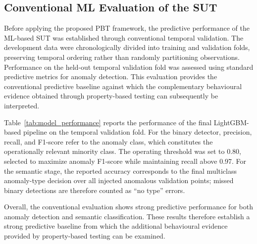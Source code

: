 \documentclass[preprint,12pt]{elsarticle}
\begin{document}
\subsection{Conventional ML Evaluation of the SUT}
\label{sec:ml_baseline}

Before applying the proposed PBT framework, the predictive performance of
the ML-based SUT was established through conventional temporal validation.
The development data were chronologically divided into training and
validation folds, preserving temporal ordering rather than randomly
partitioning observations. Performance on the held-out temporal validation
fold was assessed using standard predictive metrics for anomaly detection. This evaluation provides the conventional
predictive baseline against which the complementary behavioural evidence
obtained through property-based testing can subsequently be interpreted.

Table~\ref{tab:model_performance} reports the performance of the final
LightGBM-based pipeline on the temporal validation fold. For the binary
detector, precision, recall, and F1-score refer to the anomaly class, which
constitutes the operationally relevant minority class. The operating
threshold was set to 0.80, selected to maximize anomaly F1-score while
maintaining recall above 0.97. For the semantic stage, the reported accuracy
corresponds to the final multiclass anomaly-type decision over all injected
anomalous validation points; missed binary detections are therefore counted
as ``no type'' errors.

\begin{table}[!t]
\centering
\caption{LightGBM supervised pipeline performance on the temporal validation fold.}
\label{tab:model_performance}
\renewcommand{\arraystretch}{1.2}
\end{table}


Overall, the conventional evaluation shows strong predictive performance
for both anomaly detection and semantic classification. These results therefore establish a strong predictive baseline from which the additional behavioural evidence provided by property-based testing can be examined.
\end{document}
